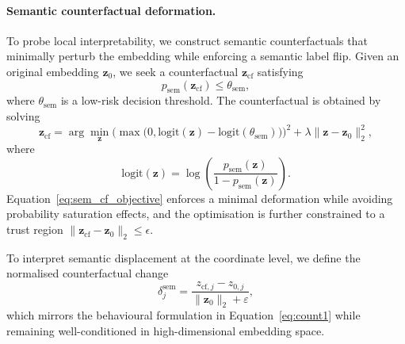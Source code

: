 \documentclass[3p]{elsarticle}
\begin{document}
\paragraph{Semantic counterfactual deformation.}
To probe local interpretability, we construct semantic counterfactuals that minimally perturb the embedding while enforcing a semantic label flip.
Given an original embedding $\mathbf{z}_0$, we seek a counterfactual
$\mathbf{z}_{\mathrm{cf}}$ satisfying
\begin{equation}
p_{\mathrm{sem}}(\mathbf{z}_{\mathrm{cf}}) \le \theta_{\mathrm{sem}},
\label{eq:sem_cf_condition}
\end{equation}
where $\theta_{\mathrm{sem}}$ is a low-risk decision threshold.
The counterfactual is obtained by solving
\begin{equation}
\mathbf{z}_{\mathrm{cf}}
=
\arg\min_{\mathbf{z}}
\Big(
\max\!\big(0, \mathrm{logit}(\mathbf{z}) - \mathrm{logit}(\theta_{\mathrm{sem}})\big)
\Big)^2
+
\lambda \lVert \mathbf{z} - \mathbf{z}_0 \rVert_2^2,
\label{eq:sem_cf_objective}
\end{equation}
where
\begin{equation}
\mathrm{logit}(\mathbf{z}) =
\log\!\left(
\frac{p_{\mathrm{sem}}(\mathbf{z})}{1 - p_{\mathrm{sem}}(\mathbf{z})}
\right).
\label{eq:sem_logit}
\end{equation}
Equation~\eqref{eq:sem_cf_objective} enforces a minimal deformation while avoiding probability
saturation effects, and the optimisation is further constrained to a trust region
$\lVert \mathbf{z}_{\mathrm{cf}} - \mathbf{z}_0 \rVert_2 \le \epsilon$.

To interpret semantic displacement at the coordinate level, we define the normalised counterfactual change
\begin{equation}
\delta^{\mathrm{sem}}_j =
\frac{z_{\mathrm{cf},j} - z_{0,j}}{\lVert \mathbf{z}_0 \rVert_2 + \varepsilon},
\label{eq:sem_delta}
\end{equation}
which mirrors the behavioural formulation in Equation~\eqref{eq:count1} while remaining well-conditioned in high-dimensional embedding space.

\vspace{0.3em}
\end{document}
